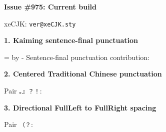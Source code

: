 \documentclass{article}
\providecommand\EvidenceLabel{Current build}
\begin{document}
{\LARGE\bfseries Issue \#975: \EvidenceLabel}\par
xeCJK: \texttt{\csname ver@xeCJK.sty\endcsname}

\bigskip
{\large\bfseries 1. Kaiming sentence-final punctuation}\par
\begingroup
  \fontsize{30}{36}\selectfont
  \sbox{}
  \sbox{}
  \fbox{\usebox\samplebox}\par
  \normalsize
  =\wd\samplebox
  \advance{} by -\wd\basebox
  Sentence-final punctuation contribution: \texttt{\the{}}
\endgroup

\medskip
{\large\bfseries 2. Centered Traditional Chinese punctuation}\par
\begingroup
  \NotoTC
  \fontsize{20}{25}\selectfont
  \sbox{}
  \sbox{}
  \fbox{\usebox\samplebox}\par
  \normalsize
  Pair \texttt{。』？！}: \texttt{\the\wd\pairbox}
\endgroup

\medskip
{\large\bfseries 3. Directional FullLeft to FullRight spacing}\par
\begingroup
  \NotoSC
  \fontsize{28}{34}\selectfont
  \sbox{}
  \sbox{}
  \fbox{\usebox\samplebox}\par
  \normalsize
  Pair \texttt{（？}: \texttt{\the\wd\pairbox}
\endgroup
\end{document}
